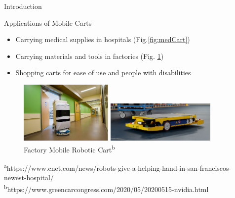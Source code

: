 \documentclass{beamer}
\begin{document}
\begin{frame}{Introduction}{}
  \begin{block}{Applications of Mobile Carts}
    \begin{itemize}
      \item Carrying medical supplies in hospitals (Fig.\ref{fig:medCart})
      \item Carrying materials and tools in factories (Fig. \ref{fig:factCart})
      \item Shopping carts for ease of use and people with disabilities
    \end{itemize}
  \end{block}
      \begin{figure}
      \centering
      \begin{minipage}[t]{0.5\textwidth}
        \centering
        \includegraphics[height=3.0cm]{figs/img/MedicalRoboticCart}
        \caption{Medical Mobile Robotic Cart\textsuperscript{a}}
        \label{fig:medCart}
      \end{minipage}
      \begin{minipage}[t]{0.4\textwidth}
        \centering
        \includegraphics[height=2.0cm]{figs/img/FactoryRoboticCart}
        \caption{Factory Mobile Robotic Cart\textsuperscript{b}}
        \label{fig:factCart}
      \end{minipage}
      \end{figure}
    \begin{tiny}
      \textsuperscript{a}https://www.cnet.com/news/robots-give-a-helping-hand-in-san-franciscos-newest-hospital/\\\textsuperscript{b}https://www.greencarcongress.com/2020/05/20200515-nvidia.html
    \end{tiny}
\end{frame}
\end{document}
